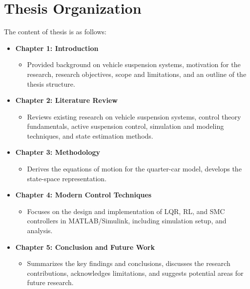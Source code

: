 \section{Thesis Organization}
The content of thesis is as follows:
\begin{itemize}
	\item \textbf{Chapter 1: Introduction}
	\begin{itemize}
		\item Provided background on vehicle suspension systems, motivation for the research, research objectives, scope and limitations, and an outline of the thesis structure. 
	\end{itemize}
	\item \textbf{Chapter 2: Literature Review}
	\begin{itemize}
		\item Reviews existing research on vehicle suspension systems, control theory fundamentals, active suspension control, simulation and modeling techniques, and state estimation methods.
	\end{itemize}
	\item \textbf{Chapter 3: Methodology}
	\begin{itemize}
		\item Derives the equations of motion for the quarter-car model, develops the state-space representation.
	\end{itemize}
	\item \textbf{Chapter 4: Modern Control Techniques}
	\begin{itemize}
		\item Focuses on the design and implementation of LQR, RL, and SMC controllers in MATLAB/Simulink, including simulation setup, and analysis.
	\end{itemize}
	\item \textbf{Chapter 5: Conclusion and Future Work}
	\begin{itemize}
		\item Summarizes the key findings and conclusions, discusses the research contributions, acknowledges limitations, and suggests potential areas for future research.
	\end{itemize}
\end{itemize}
